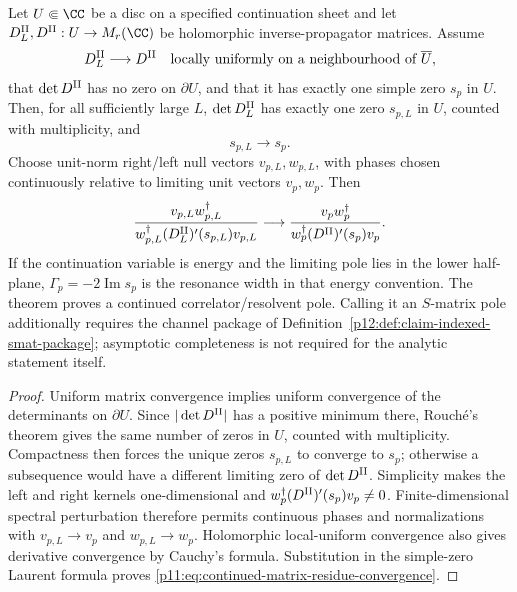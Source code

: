 \documentclass[12pt,a4paper]{article}
\begin{document}
\begin{theorem}
\label{p11:thm:isolated-resonance-pole-residue-limit}
Let \(U\Subset\CC\) be a disc on a specified continuation sheet and let
\(D_{L}^{\rm II},D^{\rm II}:U\to M_r(\CC)\) be holomorphic inverse-propagator
matrices.  Assume
\begin{equation}
\label{p11:eq:continued-inverse-propagator-convergence}
D_L^{\rm II}\longrightarrow D^{\rm II}
\quad\text{locally uniformly on a neighbourhood of }\overline U,
\end{equation}
that \(\det D^{\rm II}\) has no zero on \(\partial U\), and that it has exactly
one simple zero \(s_p\) in \(U\).  Then, for all sufficiently large \(L\),
\(\det D_L^{\rm II}\) has exactly one zero \(s_{p,L}\) in \(U\), counted with
multiplicity, and
\begin{equation}
\label{p11:eq:continued-pole-convergence}
s_{p,L}\longrightarrow s_p.
\end{equation}
Choose unit-norm right/left null vectors \(v_{p,L},w_{p,L}\), with phases
chosen continuously relative to limiting unit vectors \(v_p,w_p\).  Then
\begin{equation}
\label{p11:eq:continued-matrix-residue-convergence}
\frac{v_{p,L}w_{p,L}^\dagger}
{w_{p,L}^\dagger(D_L^{\rm II})'(s_{p,L})v_{p,L}}
\longrightarrow
\frac{v_pw_p^\dagger}
{w_p^\dagger(D^{\rm II})'(s_p)v_p}.
\end{equation}
If the continuation variable is energy and the limiting pole lies in the lower
half-plane, \(\Gamma_p=-2\operatorname{Im}s_p\) is the resonance width in that
energy convention.  The theorem proves a continued correlator/resolvent pole.
Calling it an \(S\)-matrix pole additionally requires the channel package of
Definition~\ref{p12:def:claim-indexed-smat-package}; asymptotic completeness is
not required for the analytic statement itself.
\end{theorem}
\begin{proof}
Uniform matrix convergence implies uniform convergence of the determinants on
\(\partial U\).  Since \(|\det D^{\rm II}|\) has a positive minimum there,
Rouch\'e's theorem gives the same number of zeros in \(U\), counted with
multiplicity.  Compactness then forces the unique zeros \(s_{p,L}\) to converge
to \(s_p\); otherwise a subsequence would have a different limiting zero of
\(\det D^{\rm II}\).  Simplicity makes the left and right kernels
one-dimensional and
\(w_p^\dagger(D^{\rm II})'(s_p)v_p\ne0\).  Finite-dimensional spectral
perturbation therefore permits continuous phases and normalizations with
\(v_{p,L}\to v_p\) and \(w_{p,L}\to w_p\).  Holomorphic local-uniform
convergence also gives derivative convergence by Cauchy's formula.  Substitution
in the simple-zero Laurent formula proves
\eqref{p11:eq:continued-matrix-residue-convergence}.
\end{proof}
\end{document}
